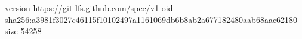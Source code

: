 version https://git-lfs.github.com/spec/v1
oid sha256:a3981f3027c46115f10102497a1161069db6b8ab2a677182480aab68aac62180
size 54258
